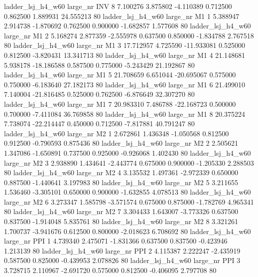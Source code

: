   ladder_lsj_h4_w60   large_nr      INV                 8  7.100276  3.875802  -4.110389 0.712500 0.862500  1.889931   24.555213 80
  ladder_lsj_h4_w60   large_nr       M1                 1  5.388947  2.914738  -1.870692 0.762500 0.900000 -1.682857    1.577608 80
  ladder_lsj_h4_w60   large_nr       M1                 2  5.168274  2.877359  -2.555978 0.637500 0.850000 -1.834788    2.767518 80
  ladder_lsj_h4_w60   large_nr       M1                 3 17.712957  4.725590 -11.933081 0.525000 0.812500 -3.820431   13.341713 80
  ladder_lsj_h4_w60   large_nr       M1                 4 21.148681  5.938178 -18.186588 0.587500 0.775000 -5.243429   21.192867 80
  ladder_lsj_h4_w60   large_nr       M1                 5 21.708659  6.651044 -20.695067 0.575000 0.750000 -6.183640   27.182173 80
  ladder_lsj_h4_w60   large_nr       M1                 6 21.499010  7.140004 -21.816485 0.525000 0.762500 -6.876649   32.307270 80
  ladder_lsj_h4_w60   large_nr       M1                 7 20.983310  7.486788 -22.168723 0.500000 0.700000 -7.411084   36.769858 80
  ladder_lsj_h4_w60   large_nr       M1                 8 20.375224  7.738074 -22.214447 0.450000 0.712500 -7.817881   40.791247 80
  ladder_lsj_h4_w60   large_nr       M2                 1  2.672861  1.436348  -1.050568 0.812500 0.912500 -0.790593    0.875436 80
  ladder_lsj_h4_w60   large_nr       M2                 2  2.505621  1.347086  -1.650891 0.737500 0.925000 -0.926068    1.402430 80
  ladder_lsj_h4_w60   large_nr       M2                 3  2.938890  1.434641  -2.443774 0.675000 0.900000 -1.205330    2.288503 80
  ladder_lsj_h4_w60   large_nr       M2                 4  3.135532  1.497361  -2.972339 0.650000 0.887500 -1.440641    3.197983 80
  ladder_lsj_h4_w60   large_nr       M2                 5  3.211655  1.536460  -3.305101 0.650000 0.900000 -1.632855    4.078513 80
  ladder_lsj_h4_w60   large_nr       M2                 6  3.273347  1.585798  -3.571574 0.675000 0.875000 -1.782769    4.965341 80
  ladder_lsj_h4_w60   large_nr       M2                 7  3.304433  1.643007  -3.773326 0.637500 0.837500 -1.914048    5.835761 80
  ladder_lsj_h4_w60   large_nr       M2                 8  3.321261  1.700737  -3.941676 0.612500 0.800000 -2.018623    6.708692 80
  ladder_lsj_h4_w60   large_nr      PPI                 1  4.739340  2.475071  -1.831366 0.637500 0.837500 -0.423946    1.213139 80
  ladder_lsj_h4_w60   large_nr      PPI                 2  4.115387  2.222247  -2.435919 0.587500 0.825000 -0.439953    2.078826 80
  ladder_lsj_h4_w60   large_nr      PPI                 3  3.728715  2.110967  -2.691720 0.575000 0.812500 -0.406095    2.797708 80
